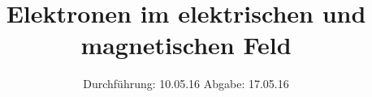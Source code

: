 

\subject{Versuch Nummer 501 und 502}
\title{Elektronen im elektrischen und magnetischen Feld}
\date{
  Durchführung: 10.05.16
  \hspace{3em}
  Abgabe: 17.05.16
}



\maketitle
\thispagestyle{empty}
\tableofcontents
\newpage






\printbibliography


